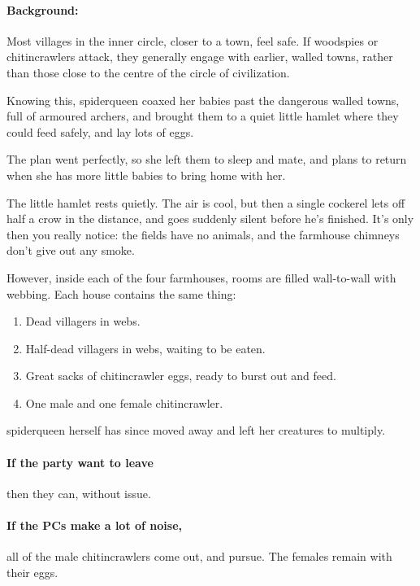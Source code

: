\begin{multicols}{2}

\paragraph{Background:}
Most villages in the inner circle, closer to a town, feel safe.
If woodspies or chitincrawlers attack, they generally engage with earlier, walled towns, rather than those close to the centre of the circle of civilization.

Knowing this, \gls{spiderqueen} coaxed her babies past the dangerous walled towns, full of armoured archers, and brought them to a quiet little hamlet where they could feed safely, and lay lots of eggs.

The plan went perfectly, so she left them to sleep and mate, and plans to return when she has more little babies to bring home with her.

\begin{boxtext}

  The little hamlet rests quietly.
  The air is cool, but then a single cockerel lets off half a crow in the distance, and goes suddenly silent before he's finished.
  It's only then you really notice: the fields have no animals, and the farmhouse chimneys don't give out any smoke.

\end{boxtext}

However, inside each of the four farmhouses, rooms are filled wall-to-wall with webbing.  Each house contains the same thing:

\begin{enumerate}
  \item
  Dead villagers in webs.
  \item
  Half-dead villagers in webs, waiting to be eaten.
  \item
  Great sacks of chitincrawler eggs, ready to burst out and feed.
  \item
  One male and one female chitincrawler.
\end{enumerate}

\Gls{spiderqueen} herself has since moved away and left her creatures to multiply.

\paragraph{If the party want to leave}
then they can, without issue.

\paragraph{If the PCs make a lot of noise,}
all of the male chitincrawlers come out, and pursue.
The females remain with their eggs.


\end{multicols}
